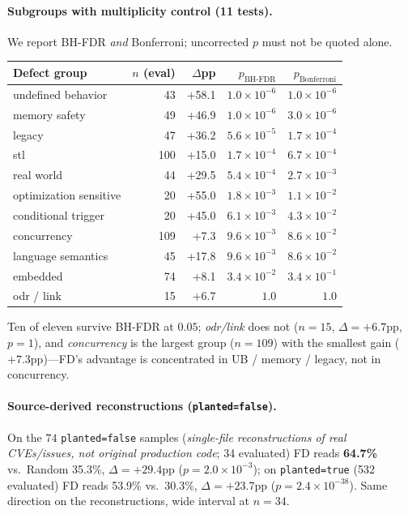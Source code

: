 \paragraph{Subgroups with multiplicity control (11 tests).}
We report BH-FDR \emph{and} Bonferroni; uncorrected $p$ must not be quoted alone.
\begin{center}\footnotesize
\begin{tabular}{@{}lrrrr@{}}
\toprule
Defect group & $n$ (eval) & $\Delta$pp & $p_{\text{BH-FDR}}$ & $p_{\text{Bonferroni}}$ \\
\midrule
undefined behavior & 43 & +58.1 & $1.0\times10^{-6}$ & $1.0\times10^{-6}$ \\
memory safety & 49 & +46.9 & $1.0\times10^{-6}$ & $3.0\times10^{-6}$ \\
legacy & 47 & +36.2 & $5.6\times10^{-5}$ & $1.7\times10^{-4}$ \\
stl & 100 & +15.0 & $1.7\times10^{-4}$ & $6.7\times10^{-4}$ \\
real world & 44 & +29.5 & $5.4\times10^{-4}$ & $2.7\times10^{-3}$ \\
optimization sensitive & 20 & +55.0 & $1.8\times10^{-3}$ & $1.1\times10^{-2}$ \\
conditional trigger & 20 & +45.0 & $6.1\times10^{-3}$ & $4.3\times10^{-2}$ \\
concurrency & 109 & +7.3 & $9.6\times10^{-3}$ & $8.6\times10^{-2}$ \\
language semantics & 45 & +17.8 & $9.6\times10^{-3}$ & $8.6\times10^{-2}$ \\
embedded & 74 & +8.1 & $3.4\times10^{-2}$ & $3.4\times10^{-1}$ \\
odr / link & 15 & +6.7 & $1.0$ & $1.0$ \\
\bottomrule
\end{tabular}
\end{center}
Ten of eleven survive BH-FDR at $0.05$; \emph{odr/link} does not ($n{=}15$, $\Delta{=}+6.7$pp,
$p{=}1$), and \emph{concurrency} is the largest group ($n{=}109$) with the smallest gain
($+7.3$pp)---FD's advantage is concentrated in UB / memory / legacy, not in concurrency.

\paragraph{Source-derived reconstructions (\texttt{planted=false}).} On the $74$
\texttt{planted=false} samples (\emph{single-file reconstructions of real CVEs/issues, not original
production code}; 34 evaluated) FD reads \textbf{64.7\%} vs.\ Random 35.3\%,
$\Delta{=}\mathbf{+29.4}$pp ($p{=}2.0\times10^{-3}$); on \texttt{planted=true} (532 evaluated) FD
reads 53.9\% vs.\ 30.3\%, $\Delta{=}\mathbf{+23.7}$pp ($p{=}2.4\times10^{-38}$). Same direction on
the reconstructions, wide interval at $n{=}34$.

